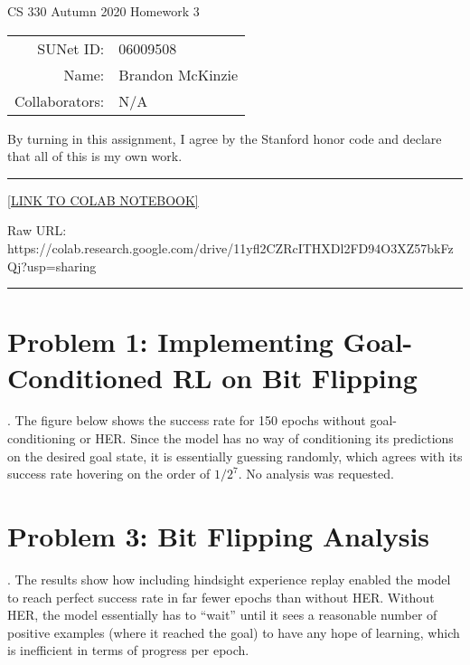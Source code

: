 \documentclass[11pt]{article}
\begin{document}
\begin{center}
	{\Large CS 330 Autumn 2020 Homework 3}
	
	\begin{tabular}{rl}
		SUNet ID: & 06009508 \\
		Name: & Brandon McKinzie \\
		Collaborators: & N/A
	\end{tabular}
\end{center}

\p By turning in this assignment, I agree by the Stanford honor code and declare
that all of this is my own work.

\rule{\linewidth}{0.4pt}

\href{https://colab.research.google.com/drive/11yfl2CZRcITHXDl2FD94O3XZ57bkFzQj?usp=sharing}{[LINK TO COLAB NOTEBOOK]}

Raw URL: https://colab.research.google.com/drive/11yfl2CZRcITHXDl2FD94O3XZ57bkFzQj?usp=sharing

\rule{\linewidth}{0.4pt}

\myspace 
\section*{Problem 1: Implementing Goal-Conditioned RL on Bit Flipping}

. The figure below shows the success rate for 150 epochs without goal-conditioning or HER. Since the model has no way of conditioning its predictions on the desired goal state, it is essentially guessing randomly, which agrees with its success rate hovering on the order of $1 / 2^{7}$. No analysis was requested. 




\clearpage
\section*{Problem 3: Bit Flipping Analysis}

. The results show how including hindsight experience replay enabled the model to reach perfect success rate in far fewer epochs than without HER. Without HER, the model essentially has to ``wait'' until it sees a reasonable number of positive examples (where it reached the goal) to have any hope of learning, which is inefficient in terms of progress per epoch. 

\end{document}
